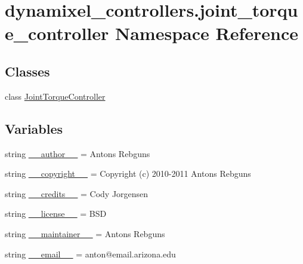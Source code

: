 \hypertarget{namespacedynamixel__controllers_1_1joint__torque__controller}{}\section{dynamixel\+\_\+controllers.\+joint\+\_\+torque\+\_\+controller Namespace Reference}
\label{namespacedynamixel__controllers_1_1joint__torque__controller}
\subsection*{Classes}
\begin{DoxyCompactItemize}
\item 
class \hyperlink{classdynamixel__controllers_1_1joint__torque__controller_1_1_joint_torque_controller}{Joint\+Torque\+Controller}
\end{DoxyCompactItemize}
\subsection*{Variables}
\begin{DoxyCompactItemize}
\item 
string \hyperlink{namespacedynamixel__controllers_1_1joint__torque__controller_a1864c5f862098779df8df727028074a7}{\+\_\+\+\_\+author\+\_\+\+\_\+} = \textquotesingle{}Antons Rebguns\textquotesingle{}
\item 
string \hyperlink{namespacedynamixel__controllers_1_1joint__torque__controller_ae56edcb938b22f763a3f4445058d1b64}{\+\_\+\+\_\+copyright\+\_\+\+\_\+} = \textquotesingle{}Copyright (c) 2010-\/2011 Antons Rebguns\textquotesingle{}
\item 
string \hyperlink{namespacedynamixel__controllers_1_1joint__torque__controller_aff238c07ff3d695cf92cc0c22e00284d}{\+\_\+\+\_\+credits\+\_\+\+\_\+} = \textquotesingle{}Cody Jorgensen\textquotesingle{}
\item 
string \hyperlink{namespacedynamixel__controllers_1_1joint__torque__controller_ae2855c4ec96576b9e921d0de1a68e017}{\+\_\+\+\_\+license\+\_\+\+\_\+} = \textquotesingle{}B\+SD\textquotesingle{}
\item 
string \hyperlink{namespacedynamixel__controllers_1_1joint__torque__controller_a28eac43de826455abef4803b61e6de8c}{\+\_\+\+\_\+maintainer\+\_\+\+\_\+} = \textquotesingle{}Antons Rebguns\textquotesingle{}
\item 
string \hyperlink{namespacedynamixel__controllers_1_1joint__torque__controller_a82317c83f6d054417de741bfa5dcf454}{\+\_\+\+\_\+email\+\_\+\+\_\+} = \textquotesingle{}anton@email.\+arizona.\+edu\textquotesingle{}
\end{DoxyCompactItemize}


